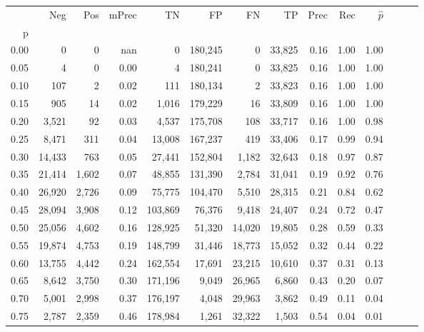 \begin{tabular}{rrrrrrrrrrrrrr}
\toprule
{} &     Neg &    Pos & mPrec &       TN &       FP &      FN &      TP &  Prec &   Rec & $\hat{p}$ \\
p    &         &        &       &          &          &         &         &       &       &           \\
\midrule
0.00 &       0 &      0 &   nan &        0 &  180,245 &       0 &  33,825 &  0.16 &  1.00 &      1.00 \\
0.05 &       4 &      0 &  0.00 &        4 &  180,241 &       0 &  33,825 &  0.16 &  1.00 &      1.00 \\
0.10 &     107 &      2 &  0.02 &      111 &  180,134 &       2 &  33,823 &  0.16 &  1.00 &      1.00 \\
0.15 &     905 &     14 &  0.02 &    1,016 &  179,229 &      16 &  33,809 &  0.16 &  1.00 &      1.00 \\
0.20 &   3,521 &     92 &  0.03 &    4,537 &  175,708 &     108 &  33,717 &  0.16 &  1.00 &      0.98 \\
0.25 &   8,471 &    311 &  0.04 &   13,008 &  167,237 &     419 &  33,406 &  0.17 &  0.99 &      0.94 \\
0.30 &  14,433 &    763 &  0.05 &   27,441 &  152,804 &   1,182 &  32,643 &  0.18 &  0.97 &      0.87 \\
0.35 &  21,414 &  1,602 &  0.07 &   48,855 &  131,390 &   2,784 &  31,041 &  0.19 &  0.92 &      0.76 \\
0.40 &  26,920 &  2,726 &  0.09 &   75,775 &  104,470 &   5,510 &  28,315 &  0.21 &  0.84 &      0.62 \\
0.45 &  28,094 &  3,908 &  0.12 &  103,869 &   76,376 &   9,418 &  24,407 &  0.24 &  0.72 &      0.47 \\
0.50 &  25,056 &  4,602 &  0.16 &  128,925 &   51,320 &  14,020 &  19,805 &  0.28 &  0.59 &      0.33 \\
0.55 &  19,874 &  4,753 &  0.19 &  148,799 &   31,446 &  18,773 &  15,052 &  0.32 &  0.44 &      0.22 \\
0.60 &  13,755 &  4,442 &  0.24 &  162,554 &   17,691 &  23,215 &  10,610 &  0.37 &  0.31 &      0.13 \\
0.65 &   8,642 &  3,750 &  0.30 &  171,196 &    9,049 &  26,965 &   6,860 &  0.43 &  0.20 &      0.07 \\
0.70 &   5,001 &  2,998 &  0.37 &  176,197 &    4,048 &  29,963 &   3,862 &  0.49 &  0.11 &      0.04 \\
0.75 &   2,787 &  2,359 &  0.46 &  178,984 &    1,261 &  32,322 &   1,503 &  0.54 &  0.04 &      0.01 \\

\end{tabular}
